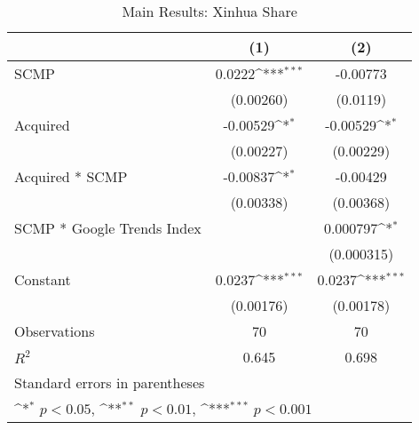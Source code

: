 \begin{table}[htbp]\centering
\def\sym#1{\ifmmode^{#1}\else\(^{#1}\)\fi}
\caption{Main Results: Xinhua Share\label{xh}}
\begin{tabular*}{0.75\textwidth}{@{\hskip\tabcolsep\extracolsep\fill}l*{2}{c}}
\hline\hline
                &\multicolumn{1}{c}{(1)}         &\multicolumn{1}{c}{(2)}         \\
\hline
SCMP            &   0.0222\sym{***}& -0.00773         \\
                &(0.00260)         & (0.0119)         \\
[1em]
Acquired        & -0.00529\sym{*}  & -0.00529\sym{*}  \\
                &(0.00227)         &(0.00229)         \\
[1em]
Acquired * SCMP & -0.00837\sym{*}  & -0.00429         \\
                &(0.00338)         &(0.00368)         \\
[1em]
SCMP * Google Trends Index&                  & 0.000797\sym{*}  \\
                &                  &(0.000315)         \\
[1em]
Constant        &   0.0237\sym{***}&   0.0237\sym{***}\\
                &(0.00176)         &(0.00178)         \\
\hline
Observations    &       70         &       70         \\
\(R^{2}\)       &    0.645         &    0.698         \\
\hline\hline
\multicolumn{3}{l}{\footnotesize Standard errors in parentheses}\\
\multicolumn{3}{l}{\footnotesize \sym{*} \(p<0.05\), \sym{**} \(p<0.01\), \sym{***} \(p<0.001\)}\\
\end{tabular*}
\end{table}
